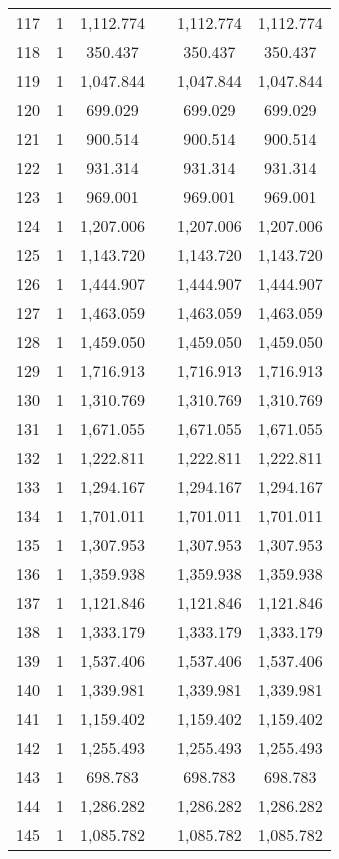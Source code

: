 \begin{table}[!htbp]
\begin{tabular}{@{\extracolsep{5pt}}lccccc}
117 & 1 & 1,112.774 &  & 1,112.774 & 1,112.774 \\ 
118 & 1 & 350.437 &  & 350.437 & 350.437 \\ 
119 & 1 & 1,047.844 &  & 1,047.844 & 1,047.844 \\ 
120 & 1 & 699.029 &  & 699.029 & 699.029 \\ 
121 & 1 & 900.514 &  & 900.514 & 900.514 \\ 
122 & 1 & 931.314 &  & 931.314 & 931.314 \\ 
123 & 1 & 969.001 &  & 969.001 & 969.001 \\ 
124 & 1 & 1,207.006 &  & 1,207.006 & 1,207.006 \\ 
125 & 1 & 1,143.720 &  & 1,143.720 & 1,143.720 \\ 
126 & 1 & 1,444.907 &  & 1,444.907 & 1,444.907 \\ 
127 & 1 & 1,463.059 &  & 1,463.059 & 1,463.059 \\ 
128 & 1 & 1,459.050 &  & 1,459.050 & 1,459.050 \\ 
129 & 1 & 1,716.913 &  & 1,716.913 & 1,716.913 \\ 
130 & 1 & 1,310.769 &  & 1,310.769 & 1,310.769 \\ 
131 & 1 & 1,671.055 &  & 1,671.055 & 1,671.055 \\ 
132 & 1 & 1,222.811 &  & 1,222.811 & 1,222.811 \\ 
133 & 1 & 1,294.167 &  & 1,294.167 & 1,294.167 \\ 
134 & 1 & 1,701.011 &  & 1,701.011 & 1,701.011 \\ 
135 & 1 & 1,307.953 &  & 1,307.953 & 1,307.953 \\ 
136 & 1 & 1,359.938 &  & 1,359.938 & 1,359.938 \\ 
137 & 1 & 1,121.846 &  & 1,121.846 & 1,121.846 \\ 
138 & 1 & 1,333.179 &  & 1,333.179 & 1,333.179 \\ 
139 & 1 & 1,537.406 &  & 1,537.406 & 1,537.406 \\ 
140 & 1 & 1,339.981 &  & 1,339.981 & 1,339.981 \\ 
141 & 1 & 1,159.402 &  & 1,159.402 & 1,159.402 \\ 
142 & 1 & 1,255.493 &  & 1,255.493 & 1,255.493 \\ 
143 & 1 & 698.783 &  & 698.783 & 698.783 \\ 
144 & 1 & 1,286.282 &  & 1,286.282 & 1,286.282 \\ 
145 & 1 & 1,085.782 &  & 1,085.782 & 1,085.782 \\ 

\end{tabular}
\end{table}

